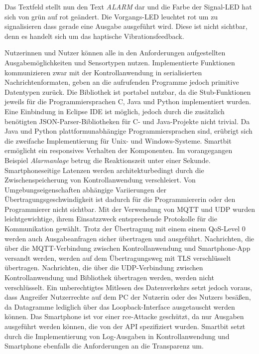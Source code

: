 \documentclass[11pt,a4paper]{report}
\begin{document}
Das Textfeld stellt nun den Text \textit{ALARM} dar und die Farbe der Signal-LED hat sich von grün auf rot geändert.
Die Vorgangs-LED leuchtet rot um zu signalisieren dass gerade eine Ausgabe ausgeführt wird.
Diese ist nicht sichtbar, denn es handelt sich um das haptische Vibrationsfeedback.

Nutzerinnen und Nutzer können alle in den Anforderungen aufgestellten Ausgabemöglichkeiten und Sensortypen nutzen.
Implementierte Funktionen kommunizieren zwar mit der Kontrollanwendung in serialisierten Nachrichtenformaten, geben an die aufrufenden Programme jedoch primitive Datentypen zurück.
Die Bibliothek ist portabel nutzbar, da die Stub-Funktionen jeweils für die Programmiersprachen C, Java und Python implementiert wurden.
Eine Einbindung in Eclipse IDE ist möglich, jedoch durch die zusätzlich benötigten JSON-Parser-Bibliotheken für C- und Java-Projekte nicht trivial.
Da Java und Python plattformunabhängige Programmiersprachen sind, erübrigt sich die zweifache Implementierung für Unix- und Windows-Systeme.
Smartbit ermöglicht ein responsives Verhalten der Komponenten.
Im vorangegangen Beispiel \textit{Alarmanlage} betrug die Reaktionszeit unter einer Sekunde.
Smartphoneseitige Latenzen werden architekturbedingt durch die Zwischenspeicherung von Kontrollanwendung verschleiert.
Von Umgebungseigenschaften abhängige Variierungen der Übertragungsgeschwindigkeit ist dadurch für die Programmiererin oder den Programmierer nicht sichtbar.
Mit der Verwendung von MQTT und UDP wurden leichtgewichtige, ihrem Einsatzzweck entsprechende Protokolle für die Kommunikation gewählt.
Trotz der Übertragung mit einem einem QoS-Level 0 werden auch Ausgabeanfragen sicher übertragen und ausgeführt.
Nachrichten, die über die MQTT-Verbindung zwischen Kontrollanwendung und Smartphone-App versandt werden, werden auf dem Übertragungsweg mit TLS verschlüsselt übertragen.
Nachrichten, die über die UDP-Verbindung zwischen Kontrollanwendung und Bibliothek übertragen werden, werden nicht verschlüsselt.
Ein unberechtigtes Mitlesen des Datenverkehrs setzt jedoch voraus, dass Angreifer Nutzerrechte auf dem PC der Nutzerin oder des Nutzers besäßen, da Datagramme lediglich über das Loopback-Interface ausgetauscht werden können.
Das Smartphone ist vor einer \acrfull{rce}-Attacke geschützt, da nur Ausgaben ausgeführt werden können, die von der API spezifiziert wurden.
Smartbit setzt durch die Implementierung von Log-Ausgaben in Kontrollanwendung und Smartphone ebenfalls die Anforderungen an die Transparenz um.
\end{document}

